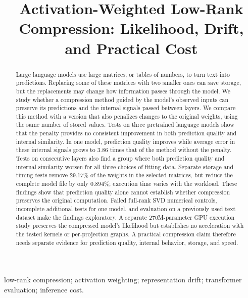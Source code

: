\documentclass[conference]{IEEEtran}
\begin{document}
\title{Activation-Weighted Low-Rank Compression: Likelihood, Drift, and Practical Cost}
\author{}
\maketitle
\begin{abstract}Large language models use large matrices, or tables of numbers, to turn text into predictions. Replacing some of these matrices with two smaller ones can save storage, but the replacements may change how information passes through the model. We study whether a compression method guided by the model's observed inputs can preserve its predictions and the internal signals passed between layers. We compare this method with a version that also penalizes changes to the original weights, using the same number of stored values. Tests on three pretrained language models show that the penalty provides no consistent improvement in both prediction quality and internal similarity. In one model, prediction quality improves while average error in these internal signals grows to 3.86 times that of the method without the penalty. Tests on consecutive layers also find a group where both prediction quality and internal similarity worsen for all three choices of fitting data. Separate storage and timing tests remove 29.17\% of the weights in the selected matrices, but reduce the complete model file by only 0.894\%; execution time varies with the workload. These findings show that prediction quality alone cannot establish whether compression preserves the original computation. Failed full-rank SVD numerical controls, incomplete additional tests for one model, and evaluation on a previously used text dataset make the findings exploratory. A separate 270M-parameter GPU execution study preserves the compressed model's likelihood but establishes no acceleration with the tested kernels or per-projection graphs. A practical compression claim therefore needs separate evidence for prediction quality, internal behavior, storage, and speed.\end{abstract}
\begin{IEEEkeywords}low-rank compression; activation weighting; representation drift; transformer evaluation; inference cost.\end{IEEEkeywords}
\end{document}
